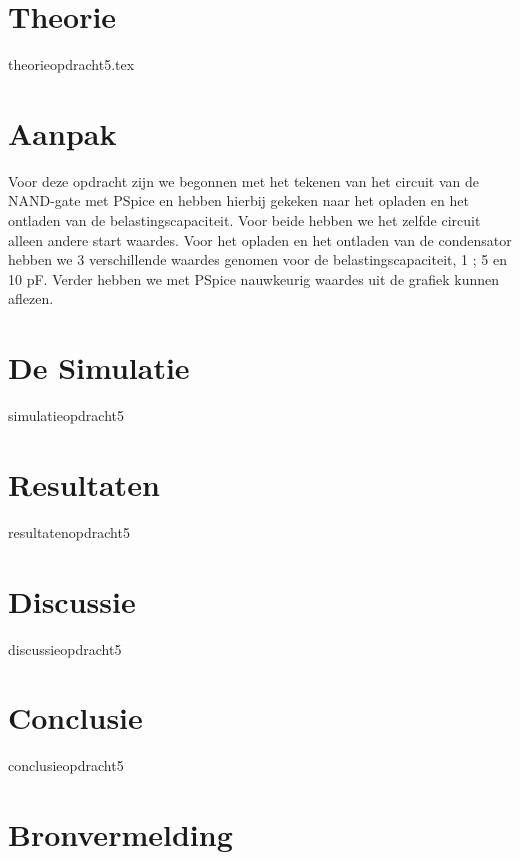\documentclass{article}
\begin{document}
\section{Theorie}

{theorieopdracht5.tex}

\section{Aanpak}

Voor deze opdracht zijn we begonnen met het tekenen van het circuit van de NAND-gate met PSpice en hebben hierbij gekeken naar het opladen en het ontladen van de belastingscapaciteit. Voor beide hebben we het zelfde circuit alleen andere start waardes. Voor het opladen en het ontladen van de condensator hebben we 3 verschillende waardes genomen voor de belastingscapaciteit, 1 ; 5 en 10 pF. Verder hebben we met PSpice nauwkeurig waardes uit de grafiek kunnen aflezen.


\section{De Simulatie}
 
{simulatieopdracht5}

\section{Resultaten}

{resultatenopdracht5}

\section{Discussie}

{discussieopdracht5}

\section{Conclusie}

{conclusieopdracht5}

\section{Bronvermelding}
\end{document}
